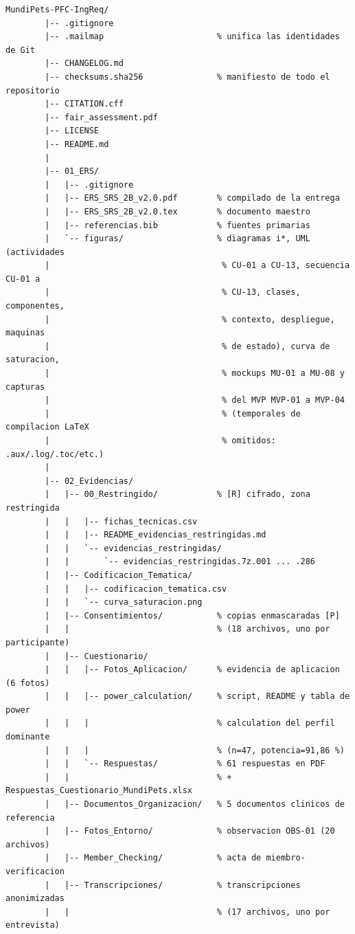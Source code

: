 \documentclass[journal,onecolumn]{IEEEtran}
\begin{document}
	\begin{lstlisting}[style=csharp,caption={Estructura de carpetas del repositorio MundiPets-PFC-IngReq.},label={lst:estructura_repo}]
		MundiPets-PFC-IngReq/
		|-- .gitignore
		|-- .mailmap                       % unifica las identidades de Git
		|-- CHANGELOG.md
		|-- checksums.sha256               % manifiesto de todo el repositorio
		|-- CITATION.cff
		|-- fair_assessment.pdf
		|-- LICENSE
		|-- README.md
		|
		|-- 01_ERS/
		|   |-- .gitignore
		|   |-- ERS_SRS_2B_v2.0.pdf        % compilado de la entrega
		|   |-- ERS_SRS_2B_v2.0.tex        % documento maestro
		|   |-- referencias.bib            % fuentes primarias
		|   `-- figuras/                   % diagramas i*, UML (actividades
		|                                   % CU-01 a CU-13, secuencia CU-01 a
		|                                   % CU-13, clases, componentes,
		|                                   % contexto, despliegue, maquinas
		|                                   % de estado), curva de saturacion,
		|                                   % mockups MU-01 a MU-08 y capturas
		|                                   % del MVP MVP-01 a MVP-04
		|                                   % (temporales de compilacion LaTeX
		|                                   % omitidos: .aux/.log/.toc/etc.)
		|
		|-- 02_Evidencias/
		|   |-- 00_Restringido/            % [R] cifrado, zona restringida
		|   |   |-- fichas_tecnicas.csv
		|   |   |-- README_evidencias_restringidas.md
		|   |   `-- evidencias_restringidas/
		|   |       `-- evidencias_restringidas.7z.001 ... .286
		|   |-- Codificacion_Tematica/
		|   |   |-- codificacion_tematica.csv
		|   |   `-- curva_saturacion.png
		|   |-- Consentimientos/           % copias enmascaradas [P]
		|   |                              % (18 archivos, uno por participante)
		|   |-- Cuestionario/
		|   |   |-- Fotos_Aplicacion/      % evidencia de aplicacion (6 fotos)
		|   |   |-- power_calculation/     % script, README y tabla de power
		|   |   |                          % calculation del perfil dominante
		|   |   |                          % (n=47, potencia=91,86 %)
		|   |   `-- Respuestas/            % 61 respuestas en PDF
		|   |                              % + Respuestas_Cuestionario_MundiPets.xlsx
		|   |-- Documentos_Organizacion/   % 5 documentos clinicos de referencia
		|   |-- Fotos_Entorno/             % observacion OBS-01 (20 archivos)
		|   |-- Member_Checking/           % acta de miembro-verificacion
		|   |-- Transcripciones/           % transcripciones anonimizadas
		|   |                              % (17 archivos, uno por entrevista)

\end{lstlisting}
\end{document}
